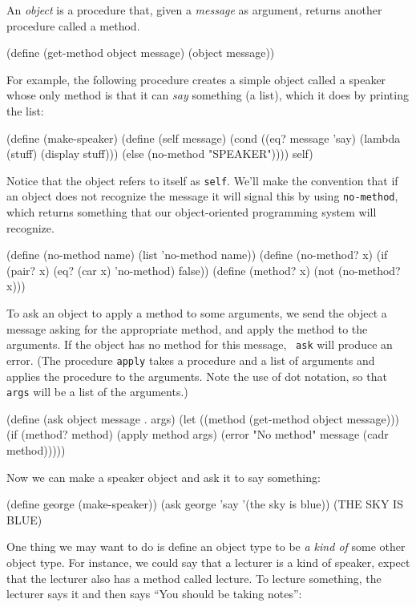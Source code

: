 An {\it  object}  is a procedure that, given a {\it message}  as
argument, returns another procedure called a method.

\beginlisp
(define (get-method object message)
  (object message))
\endlisp

For example, the following procedure creates a simple object called a
speaker whose only method is that it can {\it  say} something (a list),
which it does by printing the list:

\beginlisp
(define (make-speaker)
  (define (self message)
    (cond ((eq? message 'say)
           (lambda (stuff) (display stuff)))
          (else (no-method "SPEAKER"))))
  self)
\endlisp

Notice that the object refers to itself as {\tt self}. We'll  make the
convention that if an object does not recognize the message it will
signal this by using {\tt  no-method}, which returns something that our
object-oriented programming system will recognize.

\beginlisp
(define (no-method name)
  (list 'no-method name))
\null
(define (no-method? x)
  (if (pair? x)
      (eq? (car x) 'no-method)
      false))
\null
(define (method? x)
  (not (no-method? x)))
\endlisp


To ask  an object to apply a method to some arguments, we send the
object a message asking for the appropriate method, and apply the method
to the arguments.  If the object has no method for this message,  {\tt
ask} will produce an error.  (The procedure {\tt apply} takes a
procedure and a list of arguments and applies the procedure to the
arguments.  Note the use of dot notation, so  that {\tt args} will be a list
of the arguments.)

\beginlisp
(define (ask object message . args)
  (let ((method (get-method object message)))
    (if (method? method)
        (apply method args)
        (error "No method" message (cadr method)))))
\endlisp

Now we can make a speaker object and ask it to say something:

\beginlisp
(define george (make-speaker))
(ask george 'say '(the sky is blue))
(THE SKY IS BLUE)
\endlisp

One thing we may want to do is define an object type to be {\it a kind
of} some other object type.  For instance, we could say that a lecturer
is a kind of speaker, expect that the lecturer also has a method called
lecture.  To lecture something, the lecturer says it and then says ``You
should be taking notes'':


